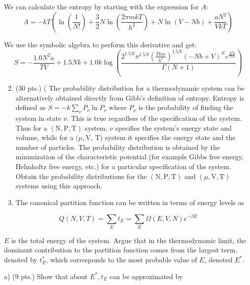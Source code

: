 \documentclass[10pt]{article}
\begin{document}
We can calculate the entropy by starting with the expression for \( A \):
\begin{equation}
  A = - k T \left( \ln \left( \frac{1}{N !} \right) + \frac{3}{2} N \ln \left( \frac{2 \pi m k T}{h^{2}} \right) + N \ln \left( V-N b \right) + \frac{a N^{2}}{V k T} \right)
\end{equation}

We use the symbolic algebra to perform this derivative and get:
\begin{equation}
  S = - \frac{1.0 N^{2} a}{T V} + 1.5 N k + 1.0 k \log{\left(\frac{2^{1.5 N} \pi^{1.5 N} \left(\frac{T k m}{h^{2}}\right)^{1.5 N} \left(- N b + V\right)^{N} e^{\frac{N^{2} a}{T V k}}}{\Gamma\left(N + 1\right)} \right)}
\end{equation}


\begin{enumerate}
  \setcounter{enumi}{1}
  \item (30 pts.) ( The probability distribution for a thermodynamic system can be alternatively obtained directly from Gibb's definition of entropy. Entropy is defined as $S=-k \sum_{\nu} P_{\nu} \ln P_{\nu}$ where $P_{\nu}$ is the probability of finding the system in state $\nu$. This is true regardless of the specification of the system. Thus for a $(\mathrm{N}, \mathrm{P}, \mathrm{T})$ system, $\nu$ specifies the system's energy state and volume, while for a $(\mu, \mathrm{V}$, T) system it specifies the energy state and the number of particles. The probability distribution is obtained by the minimization of the characteristic potential (for example Gibbs free energy, Helmholtz free energy, etc.) for a particular specification of the system. Obtain the probability distributions for the $(\mathrm{N}, \mathrm{P}, \mathrm{T})$ and $(\mu, \mathrm{V}, \mathrm{T})$ systems using this approach.

  \item The canonical partition function can be written in terms of energy levels as

\end{enumerate}

$$
Q(N, V, T)=\sum_{E} t_{E}=\sum_{E} \Omega(E, V, N) e^{-\beta E}
$$

$E$ is the total energy of the system. Argue that in the thermodynamic limit, the dominant contribution to the partition function comes from the largest term, denoted by $t_{E}^{*}$, which corresponds to the most probable value of $E$, denoted $E^{*}$.

a) (9 pts.) Show that about $E^{*}, t_{E}$ can be approximated by
\end{document}
